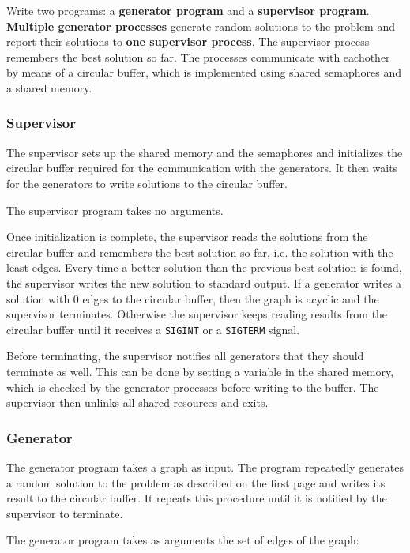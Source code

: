 Write two programs: a \textbf{generator program} and a \textbf{supervisor program}.
\textbf{Multiple generator processes} generate random solutions to the problem
and report their solutions to \textbf{one supervisor process}.
The supervisor process remembers the best solution so far.
The processes communicate with eachother by means of a circular buffer,
which is implemented using shared semaphores and a shared memory.

\subsubsection*{Supervisor}

The supervisor sets up the shared memory and the semaphores
and initializes the circular buffer
required for the communication with the generators.
It then waits for the generators to write solutions to the circular buffer.

The supervisor program takes no arguments.

Once initialization is complete,
the supervisor reads the solutions from the circular buffer
and remembers the best solution so far, i.e. the solution with the least edges.
Every time a better solution than the previous best solution is found,
the supervisor writes the new solution to standard output.
If a generator writes a solution with 0 edges to the circular buffer,
then the graph is acyclic and the supervisor terminates.
Otherwise the supervisor keeps reading results from the circular buffer
until it receives a \texttt{SIGINT} or a \texttt{SIGTERM} signal.

Before terminating, the supervisor notifies all generators
that they should terminate as well.
This can be done by setting a variable in the shared memory,
which is checked by the generator processes before writing to the buffer.
The supervisor then unlinks all shared resources and exits.

\subsubsection*{Generator}

The generator program takes a graph as input.
The program repeatedly generates a random solution to the problem as described on the first page
and writes its result to the circular buffer.
It repeats this procedure until it is notified by the supervisor to terminate.

The generator program takes as arguments the set of edges of the graph:

